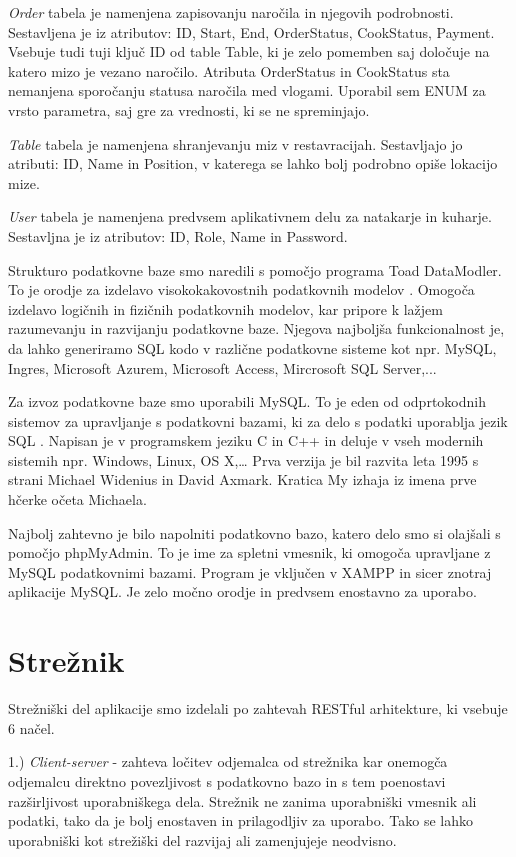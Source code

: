 \documentclass[a4paper, 12pt]{book}
\begin{document}
\textit{Order} tabela je namenjena zapisovanju naročila in njegovih podrobnosti. Sestavljena je iz atributov: ID, Start, End, OrderStatus, CookStatus, Payment. Vsebuje tudi tuji ključ ID od table Table, ki je zelo pomemben saj določuje na katero mizo je vezano naročilo. Atributa OrderStatus in CookStatus sta nemanjena sporočanju statusa naročila med vlogami. Uporabil sem ENUM za vrsto parametra, saj gre za vrednosti, ki se ne spreminjajo.

\textit{Table} tabela je namenjena shranjevanju miz v restavracijah. Sestavljajo jo atributi: ID, Name in Position, v katerega se lahko bolj podrobno opiše lokacijo mize.

\textit{User} tabela je namenjena predvsem aplikativnem delu za natakarje in kuharje. Sestavljna je iz atributov: ID, Role, Name in Password. 

Strukturo podatkovne baze smo naredili s pomočjo programa Toad DataModler. To je orodje za izdelavo visokokakovostnih podatkovnih modelov \cite{Toad_Data_Modeler}. Omogoča izdelavo logičnih in fizičnih podatkovnih modelov, kar pripore k lažjem razumevanju in razvijanju podatkovne baze. Njegova najboljša funkcionalnost je, da lahko generiramo SQL kodo v različne podatkovne sisteme kot npr. MySQL, Ingres, Microsoft Azurem, Microsoft Access, Mircrosoft SQL Server,... 

Za izvoz podatkovne baze smo uporabili MySQL. To je eden od odprtokodnih sistemov za upravljanje s podatkovni bazami, ki za delo s podatki uporablja jezik SQL \cite{MySQL}. Napisan je v programskem jeziku C in C++ in deluje v vseh modernih sistemih npr. Windows, Linux, OS X,… Prva verzija je bil razvita leta 1995 s strani Michael Widenius in David Axmark. Kratica My izhaja iz imena prve hčerke očeta Michaela.  

Najbolj zahtevno je bilo napolniti podatkovno bazo, katero delo smo si olajšali s pomočjo phpMyAdmin. To je ime za spletni vmesnik, ki omogoča upravljane z MySQL podatkovnimi bazami. Program je vključen v XAMPP in sicer znotraj aplikacije MySQL. Je zelo močno orodje in predvsem enostavno za uporabo.

\section{Strežnik}
Strežniški del aplikacije smo izdelali po zahtevah RESTful arhitekture, ki vsebuje 6 načel. 

1.)\textit{ Client-server} - zahteva ločitev odjemalca od strežnika kar onemogča odjemalcu direktno povezljivost s podatkovno bazo in s tem poenostavi razširljivost uporabniškega dela. Strežnik ne zanima uporabniški vmesnik ali podatki, tako da je bolj enostaven in prilagodljiv za uporabo. Tako se lahko uporabniški kot strežiški del razvijaj ali zamenjujeje neodvisno.
\end{document}
